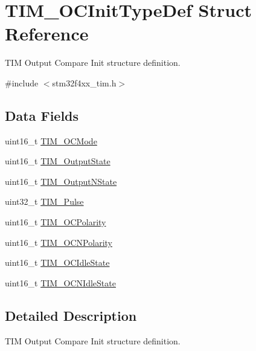 \hypertarget{struct_t_i_m___o_c_init_type_def}{\section{T\-I\-M\-\_\-\-O\-C\-Init\-Type\-Def Struct Reference}
\label{struct_t_i_m___o_c_init_type_def}
}


T\-I\-M Output Compare Init structure definition.  




{\ttfamily \#include $<$stm32f4xx\-\_\-tim.\-h$>$}

\subsection*{Data Fields}
\begin{DoxyCompactItemize}
\item 
uint16\-\_\-t \hyperlink{struct_t_i_m___o_c_init_type_def_afa69e616eb0b11bd238062dd8a5ceaa5}{T\-I\-M\-\_\-\-O\-C\-Mode}
\item 
uint16\-\_\-t \hyperlink{struct_t_i_m___o_c_init_type_def_a1e88e3081574da1e1abc089df87985ba}{T\-I\-M\-\_\-\-Output\-State}
\item 
uint16\-\_\-t \hyperlink{struct_t_i_m___o_c_init_type_def_a74a30f1a994c6676c0ce2b56243ed184}{T\-I\-M\-\_\-\-Output\-N\-State}
\item 
uint32\-\_\-t \hyperlink{struct_t_i_m___o_c_init_type_def_afd7020848ac0ad264aa3c4687f3c3ec4}{T\-I\-M\-\_\-\-Pulse}
\item 
uint16\-\_\-t \hyperlink{struct_t_i_m___o_c_init_type_def_acc7066b59671f62f2696c382c879c9c8}{T\-I\-M\-\_\-\-O\-C\-Polarity}
\item 
uint16\-\_\-t \hyperlink{struct_t_i_m___o_c_init_type_def_aa392739b843a7974702c5ec71864f982}{T\-I\-M\-\_\-\-O\-C\-N\-Polarity}
\item 
uint16\-\_\-t \hyperlink{struct_t_i_m___o_c_init_type_def_afb328e9ef4de6eb9d78390d7366b9a6e}{T\-I\-M\-\_\-\-O\-C\-Idle\-State}
\item 
uint16\-\_\-t \hyperlink{struct_t_i_m___o_c_init_type_def_a68f0241aa8d57bb42cd8e56c153f8e48}{T\-I\-M\-\_\-\-O\-C\-N\-Idle\-State}
\end{DoxyCompactItemize}


\subsection{Detailed Description}
T\-I\-M Output Compare Init structure definition. 

